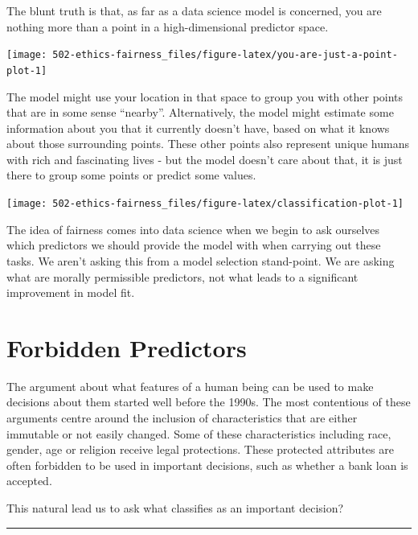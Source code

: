 \documentclass[
  12pt,
]{book}
\begin{document}
The blunt truth is that, as far as a data science model is concerned, you are nothing more than a point in a high-dimensional predictor space.

\begin{center}\texttt{[image: 502-ethics-fairness\_files/figure-latex/you-are-just-a-point-plot-1]} \end{center}

The model might use your location in that space to group you with other points that are in some sense ``nearby''. Alternatively, the model might estimate some information about you that it currently doesn't have, based on what it knows about those surrounding points. These other points also represent unique humans with rich and fascinating lives - but the model doesn't care about that, it is just there to group some points or predict some values.

\begin{center}\texttt{[image: 502-ethics-fairness\_files/figure-latex/classification-plot-1]} \end{center}

The idea of fairness comes into data science when we begin to ask ourselves which predictors we should provide the model with when carrying out these tasks. We aren't asking this from a model selection stand-point. We are asking what are morally permissible predictors, not what leads to a significant improvement in model fit.

\hypertarget{forbidden-predictors}{%
\section{Forbidden Predictors}\label{forbidden-predictors}}

The argument about what features of a human being can be used to make decisions about them started well before the 1990s. The most contentious of these arguments centre around the inclusion of characteristics that are either immutable or not easily changed. Some of these characteristics including race, gender, age or religion receive legal protections. These protected attributes are often forbidden to be used in important decisions, such as whether a bank loan is accepted.

This natural lead us to ask what classifies as an important decision?

\begin{center}\rule{0.5\linewidth}{0.5pt}\end{center}
\end{document}
